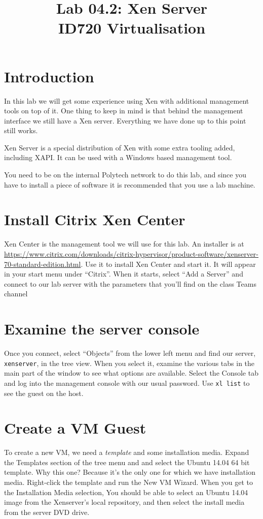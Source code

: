 \documentclass{article}
\begin{document}
\title{Lab 04.2: Xen Server\\ ID720 Virtualisation}
\date{}
\maketitle

\section*{Introduction}
In this lab we will get some experience using Xen with additional management tools on top of it. One thing to keep in mind is that behind the management interface we still have a Xen server. Everything we have done up to this point still works.

Xen Server is a special distribution of Xen with some extra tooling added, including XAPI. It can be used with a Windows 
based management tool. 

You need to be on the internal Polytech network to do this lab, and since you have to install a piece of software it is recommended that you use a lab machine.
 
 \section{Install Citrix Xen Center}
 Xen Center is the management tool we will use for this lab. An installer is at \\
 \url{https://www.citrix.com/downloads/citrix-hypervisor/product-software/xenserver-70-standard-edition.html}. Use it to install
 Xen Center and start it. It will appear in your start menu under ``Citrix''. When it starts, select ``Add a Server'' and connect to our lab server with the parameters that you'll find on the class Teams channel  
  
  
  \section{Examine the server console}
 
 Once you connect, select ``Objects'' from the lower left menu and find our server, \texttt{xenserver}, in the tree 
 view. When you select it, examine the various tabs in the main part of the window to see what options are available. 
 Select the Console tab and log into the management console with our usual password. Use \texttt{xl list} to see the guest on the host.
 
 
\section{Create a VM Guest} 
 To create a new VM, we need a \emph{template} and some installation media. Expand the Templates section of the 
 tree menu and  and select the Ubuntu 14.04 64 bit template. Why this one? Because it's the only one for which we have installation media. Right-click the template and run the New VM Wizard. When you get to the Installation Media selection, You should be able to select an Ubuntu 14.04 image from the Xenserver's local repository, and then select the install media from the server DVD drive.
 
\end{document}
